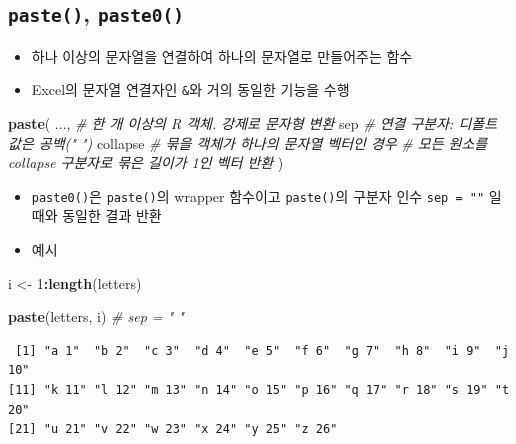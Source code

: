 \documentclass[
  11pt,
]{krantz}
\newenvironment{Shaded}{\begin{snugshade}}{\end{snugshade}}
\newcommand{\CommentTok}[1]{\textcolor[rgb]{0.37,0.37,0.37}{\textit{#1}}}
\newcommand{\DecValTok}[1]{\textcolor[rgb]{0.06,0.06,0.06}{#1}}
\newcommand{\KeywordTok}[1]{\textcolor[rgb]{0.27,0.27,0.27}{\textbf{#1}}}
\newcommand{\NormalTok}[1]{#1}
\newcommand{\OperatorTok}[1]{\textcolor[rgb]{0.43,0.43,0.43}{\textbf{#1}}}
\newcommand{\StringTok}[1]{\textcolor[rgb]{0.5,0.5,0.5}{#1}}
\providecommand{\tightlist}{%
  \setlength{\itemsep}{0pt}\setlength{\parskip}{0pt}}
\begin{document}
\normalsize

\hypertarget{paste}{%
\subsection{\texorpdfstring{\textbf{\texttt{paste()}}, \textbf{\texttt{paste0()}}}{paste(), paste0()}}\label{paste}}

\begin{itemize}
\tightlist
\item
  하나 이상의 문자열을 연결하여 하나의 문자열로 만들어주는 함수
\item
  Excel의 문자열 연결자인 \texttt{\&}와 거의 동일한 기능을 수행
\end{itemize}

\footnotesize

\begin{Shaded}
\begin{Highlighting}[]
\KeywordTok{paste}\NormalTok{(}
\NormalTok{  ..., }\CommentTok{# 한 개 이상의 R 객체. 강제로 문자형 변환}
\NormalTok{  sep  }\CommentTok{# 연결 구분자: 디폴트 값은 공백(" ")}
\NormalTok{  collapse }\CommentTok{# 묶을 객체가 하나의 문자열 벡터인 경우}
           \CommentTok{# 모든 원소를 collapse 구분자로 묶은 길이가 1인 벡터 반환}
\NormalTok{)}
\end{Highlighting}
\end{Shaded}

\normalsize

\begin{itemize}
\tightlist
\item
  \texttt{paste0()}은 \texttt{paste()}의 wrapper 함수이고 \texttt{paste()}의 구분자 인수 \texttt{sep\ =\ ""} 일 때와 동일한 결과 반환
\item
  예시
\end{itemize}

\footnotesize

\begin{Shaded}
\begin{Highlighting}[]
\NormalTok{i <-}\StringTok{ }\DecValTok{1}\OperatorTok{:}\KeywordTok{length}\NormalTok{(letters)}

\KeywordTok{paste}\NormalTok{(letters, i) }\CommentTok{# sep = " "}
\end{Highlighting}
\end{Shaded}

\begin{verbatim}
 [1] "a 1"  "b 2"  "c 3"  "d 4"  "e 5"  "f 6"  "g 7"  "h 8"  "i 9"  "j 10"
[11] "k 11" "l 12" "m 13" "n 14" "o 15" "p 16" "q 17" "r 18" "s 19" "t 20"
[21] "u 21" "v 22" "w 23" "x 24" "y 25" "z 26"
\end{verbatim}
\end{document}
